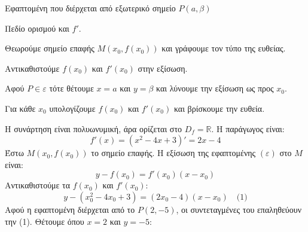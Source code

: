 \begin{askhsh}{Εφαπτομένη που διέρχεται από εξωτερικό σημείο $ P(a,\beta) $}
\bhmata\begin{bhma}
\item Πεδίο ορισμού και $ f' $.
\item Θεωρούμε σημείο επαφής $ M(x_0,f(x_0)) $ και γράφουμε τον τύπο της ευθείας.
\item Αντικαθιστούμε $ f(x_0) $ και $ f'(x_0) $ στην εξίσωση.
\item Αφού $ P\in\varepsilon $ τότε θέτουμε $ x=a $ και $ y=\beta $ και λύνουμε την εξίσωση ως προς $ x_0 $.
\item Για κάθε $ x_0 $ υπολογίζουμε $ f(x_0) $ και $ f'(x_0) $ και βρίσκουμε την ευθεία.
\end{bhma}
\end{askhsh}

\lysh
Η συνάρτηση είναι πολυωνυμική, άρα ορίζεται στο $D_f = \mathbb{R}$. Η παράγωγος είναι:
\[ f'(x) = (x^2 - 4x + 3)' = 2x - 4 \]
Έστω $M(x_0, f(x_0))$ το σημείο επαφής. Η εξίσωση της εφαπτομένης $(\varepsilon)$ στο $M$ είναι:
\[ y - f(x_0) = f'(x_0)(x - x_0) \]
Αντικαθιστούμε τα $f(x_0)$ και $f'(x_0)$:
\[ y - (x_0^2 - 4x_0 + 3) = (2x_0 - 4)(x - x_0) \quad \text{(1)} \]
Αφού η εφαπτομένη διέρχεται από το $P(2, -5)$, οι συντεταγμένες του επαληθεύουν την (1). Θέτουμε όπου $x = 2$ και $y = -5$:

